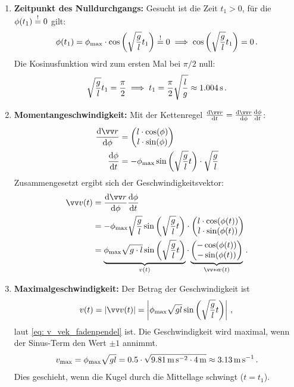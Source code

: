 \documentclass[ngerman]{scrreprt}
\newenvironment{loesungbox}[1]
  {\needspace{5\baselineskip}\begin{loesungboxstyle}[frametitle={#1}]}
  {\end{loesungboxstyle}}
\begin{document}
\begin{loesungbox}{Lösung zu \Cref{aufg:fadenpendel}}
\begin{enumerate}
    \item \textbf{Zeitpunkt des Nulldurchgangs:}
    Gesucht ist die Zeit $t_1>0$, für die $\phi(t_1) \stackrel{!}{=} 0$ gilt:
    \begin{equation}
        \phi(t_1) = \phi_{\max}\cdot \cos\left(\sqrt{\frac{g}{l}}t_1\right) \stackrel{!}{=} 0 \implies \cos\left(\sqrt{\frac{g}{l}}t_1\right) = 0 \,.
    \end{equation}
    Die Kosinusfunktion wird zum ersten Mal bei $\pi/2$ null:
    \begin{equation}
        \sqrt{\frac{g}{l}}t_1 = \frac{\pi}{2} \implies t_1 = \frac{\pi}{2}\sqrt{\frac{l}{g}} \approx \SI{1,004}{\second} \,.
    \end{equation}
    
    \item \textbf{Momentangeschwindigkeit:}
    Mit der Kettenregel $\frac{\dd\ivec{r}}{\dd t} = \frac{\dd\ivec{r}}{\dd\phi} \frac{\dd\phi}{\dd t}$:
    \begin{align}
        \frac{\dd\ivec{r}}{\dd\phi} &= \icolTwo{l\cdot \cos(\phi)}{l\cdot \sin(\phi)} \\
        \frac{\dd\phi}{\dd t} &= -\phi_{\max} \sin\left(\sqrt{\frac{g}{l}}t\right) \cdot \sqrt{\frac{g}{l}}
    \end{align}
    Zusammengesetzt ergibt sich der Geschwindigkeitsvektor:
    \begin{equation}\label{eq: v_vek_fadenpendel}\begin{aligned}
        \ivec{v}(t) &= \frac{\dd\ivec{r}}{\dd\phi} \frac{\dd\phi}{\dd t} \\
        &= -\phi_{\max} \sqrt{\frac{g}{l}} \sin\left(\sqrt{\frac{g}{l}}t\right) \cdot \icolTwo{l\cdot \cos(\phi(t))}{l\cdot \sin(\phi(t))} \\
        &= \underbrace{\phi_{\max} \sqrt{g\cdot l} \sin\left(\sqrt{\frac{g}{l}}t\right)}_{v(t)} \cdot \underbrace{\icolTwo{-\cos(\phi(t))}{-\sin(\phi(t))}}_{\ivecS{e}{v}(t)} \mDot
    \end{aligned}\end{equation}
    
    \item \textbf{Maximalgeschwindigkeit:}
    Der Betrag der Geschwindigkeit ist 
    $$v(t) = |\ivec{v}(t)| = \left| \phi_{\max} \sqrt{gl} \sin\left(\sqrt{\frac{g}{l}}t\right) \right| \mComma$$ laut \cref{eq: v_vek_fadenpendel} ist. Die Geschwindigkeit wird maximal, wenn der Sinus-Term den Wert $\pm 1$ annimmt.
    \begin{equation}
        v_{\max} = \phi_{\max}\sqrt{gl} = \SI{0,5}{} \cdot \sqrt{\SI{9,81}{\meter\per\second\squared} \cdot \SI{4}{\meter}} \approx \SI{3,13}{\meter\per\second} \,.
    \end{equation}
    Dies geschieht, wenn die Kugel durch die Mittellage schwingt ($t=t_1$).
    

\end{enumerate}
\end{loesungbox}
\end{document}
